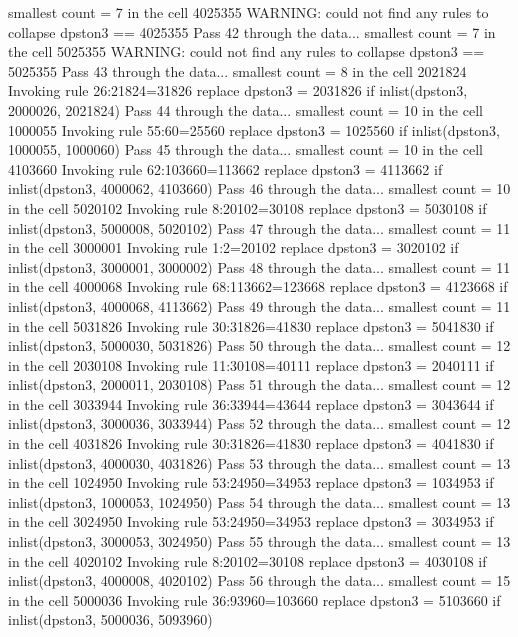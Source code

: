   smallest count = 7 in the cell      4025355
  WARNING: could not find any rules to collapse dpston3 == 4025355
Pass 42 through the data...
  smallest count = 7 in the cell      5025355
  WARNING: could not find any rules to collapse dpston3 == 5025355
Pass 43 through the data...
  smallest count = 8 in the cell      2021824
  Invoking rule 26:21824=31826
  replace dpston3 = 2031826 if inlist(dpston3, 2000026, 2021824)
Pass 44 through the data...
  smallest count = 10 in the cell      1000055
  Invoking rule 55:60=25560
  replace dpston3 = 1025560 if inlist(dpston3, 1000055, 1000060)
Pass 45 through the data...
  smallest count = 10 in the cell      4103660
  Invoking rule 62:103660=113662
  replace dpston3 = 4113662 if inlist(dpston3, 4000062, 4103660)
Pass 46 through the data...
  smallest count = 10 in the cell      5020102
  Invoking rule 8:20102=30108
  replace dpston3 = 5030108 if inlist(dpston3, 5000008, 5020102)
Pass 47 through the data...
  smallest count = 11 in the cell      3000001
  Invoking rule 1:2=20102
  replace dpston3 = 3020102 if inlist(dpston3, 3000001, 3000002)
Pass 48 through the data...
  smallest count = 11 in the cell      4000068
  Invoking rule 68:113662=123668
  replace dpston3 = 4123668 if inlist(dpston3, 4000068, 4113662)
Pass 49 through the data...
  smallest count = 11 in the cell      5031826
  Invoking rule 30:31826=41830
  replace dpston3 = 5041830 if inlist(dpston3, 5000030, 5031826)
Pass 50 through the data...
  smallest count = 12 in the cell      2030108
  Invoking rule 11:30108=40111
  replace dpston3 = 2040111 if inlist(dpston3, 2000011, 2030108)
Pass 51 through the data...
  smallest count = 12 in the cell      3033944
  Invoking rule 36:33944=43644
  replace dpston3 = 3043644 if inlist(dpston3, 3000036, 3033944)
Pass 52 through the data...
  smallest count = 12 in the cell      4031826
  Invoking rule 30:31826=41830
  replace dpston3 = 4041830 if inlist(dpston3, 4000030, 4031826)
Pass 53 through the data...
  smallest count = 13 in the cell      1024950
  Invoking rule 53:24950=34953
  replace dpston3 = 1034953 if inlist(dpston3, 1000053, 1024950)
Pass 54 through the data...
  smallest count = 13 in the cell      3024950
  Invoking rule 53:24950=34953
  replace dpston3 = 3034953 if inlist(dpston3, 3000053, 3024950)
Pass 55 through the data...
  smallest count = 13 in the cell      4020102
  Invoking rule 8:20102=30108
  replace dpston3 = 4030108 if inlist(dpston3, 4000008, 4020102)
Pass 56 through the data...
  smallest count = 15 in the cell      5000036
  Invoking rule 36:93960=103660
  replace dpston3 = 5103660 if inlist(dpston3, 5000036, 5093960)
